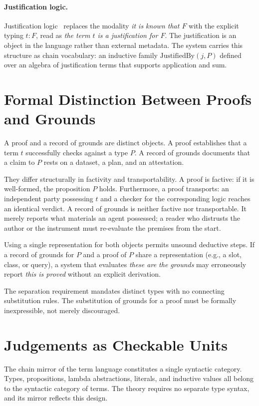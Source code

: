 \documentclass[manuscript,nonacm=true]{acmart}
\begin{document}
\paragraph{Justification logic.} Justification logic~\cite{af19} replaces the modality \emph{it is known that $F$} with the explicit typing $t : F$, read as \emph{the term $t$ is a justification for $F$}. The justification is an object in the language rather than external metadata. The system carries this structure as chain vocabulary: an inductive family $\mathrm{JustifiedBy}(j, P)$ defined over an algebra of justification terms that supports application and sum.

\section{Formal Distinction Between Proofs and Grounds}

A proof and a record of grounds are distinct objects. A proof establishes that a term $t$ successfully checks against a type $P$. A record of grounds documents that a claim to $P$ rests on a dataset, a plan, and an attestation.

They differ structurally in factivity and transportability. A proof is factive: if it is well-formed, the proposition $P$ holds. Furthermore, a proof transports: an independent party possessing $t$ and a checker for the corresponding logic reaches an identical verdict. A record of grounds is neither factive nor transportable. It merely reports what materials an agent possessed; a reader who distrusts the author or the instrument must re-evaluate the premises from the start.

Using a single representation for both objects permits unsound deductive steps. If a record of grounds for $P$ and a proof of $P$ share a representation (e.g., a slot, class, or query), a system that evaluates \emph{these are the grounds} may erroneously report \emph{this is proved} without an explicit derivation.

The separation requirement mandates distinct types with no connecting substitution rules. The substitution of grounds for a proof must be formally inexpressible, not merely discouraged.

\section{Judgements as Checkable Units}

The chain mirror of the term language constitutes a single syntactic category. Types, propositions, lambda abstractions, literals, and inductive values all belong to the syntactic category of terms. The theory requires no separate type syntax, and its mirror reflects this design.
\end{document}
